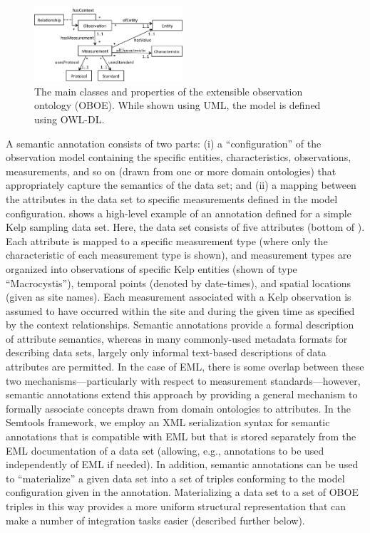 \begin{figure}[!t]
  \centering
  \includegraphics[width=0.49\textwidth]{images/oboe}
  \caption{The main classes and properties of the extensible
    observation ontology (OBOE). While shown using UML, the model is
    defined using OWL-DL.}
  \label{fig:oboe}
\end{figure}

 A semantic annotation consists of two
parts: (i) a ``configuration'' of the observation model containing the
specific entities, characteristics, observations, measurements, and so
on (drawn from one or more domain ontologies) that appropriately
capture the semantics of the data set; and (ii) a mapping between the
attributes in the data set to specific measurements defined in the
model configuration.  shows a high-level
example of an annotation defined for a simple Kelp sampling data
set. Here, the data set consists of five attributes (bottom of
). Each attribute is mapped to a specific
measurement type (where only the characteristic of each measurement
type is shown), and measurement types are organized into observations
of specific Kelp entities (shown of type ``Macrocystis''), temporal
points (denoted by date-times), and spatial locations (given as site
names). Each measurement associated with a Kelp observation is assumed
to have occurred within the site and during the given time as
specified by the context relationships.  Semantic annotations provide
a formal description of attribute semantics, whereas in many
commonly-used metadata formats for describing data sets, largely only
informal text-based descriptions of data attributes are permitted.  In
the case of EML, there is some overlap between these two
mechanisms---particularly with respect to measurement
standards---however, semantic annotations extend this approach by
providing a general mechanism to formally associate concepts drawn
from domain ontologies to attributes. In the Semtools framework, we
employ an XML serialization syntax for semantic annotations that is
compatible with EML but that is stored separately from the EML
documentation of a data set (allowing, e.g., annotations to be used
independently of EML if needed). In addition, semantic annotations can
be used to ``materialize'' a given data set into a set of triples
conforming to the model configuration given in the annotation.
Materializing a data set to a set of OBOE triples in this way provides
a more uniform structural representation that can make a number of
integration tasks easier (described further below).


